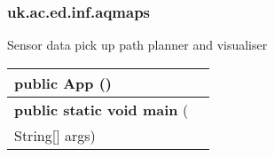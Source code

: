 \subsubsection{ uk.ac.ed.inf.aqmaps }
 { Sensor data pick up path planner and visualiser
 
\begin{tabular}{ p{3in}|m{3.4in}}
\textbf{public App} () & \\ \hline 
\textbf{public static void main } (\\ \hspace*{ 5pt} String{[}{]} args) & \\ \hline 
\end{tabular}
}
